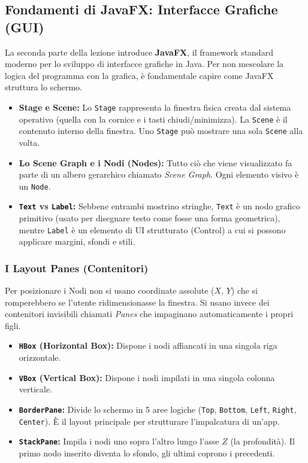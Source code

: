 \documentclass[12pt, a4paper]{article}
\begin{document}
\newpage

\subsection{Fondamenti di JavaFX: Interfacce Grafiche (GUI)}


La seconda parte della lezione introduce \textbf{JavaFX}, il framework standard moderno per lo sviluppo di interfacce grafiche in Java. Per non mescolare la logica del programma con la grafica, è fondamentale capire come JavaFX struttura lo schermo.

\begin{itemize}
    \item \textbf{Stage e Scene:} Lo \texttt{Stage} rappresenta la finestra fisica creata dal sistema operativo (quella con la cornice e i tasti chiudi/minimizza). La \texttt{Scene} è il contenuto interno della finestra. Uno \texttt{Stage} può mostrare una sola \texttt{Scene} alla volta.
    \item \textbf{Lo Scene Graph e i Nodi (Nodes):} Tutto ciò che viene visualizzato fa parte di un albero gerarchico chiamato \textit{Scene Graph}. Ogni elemento visivo è un \texttt{Node}.
    \item \textbf{\texttt{Text} vs \texttt{Label}:} Sebbene entrambi mostrino stringhe, \texttt{Text} è un nodo grafico primitivo (usato per disegnare testo come fosse una forma geometrica), mentre \texttt{Label} è un elemento di UI strutturato (Control) a cui si possono applicare margini, sfondi e stili.
\end{itemize}

\subsubsection{I Layout Panes (Contenitori)}


Per posizionare i Nodi non si usano coordinate assolute ($X$, $Y$) che si romperebbero se l'utente ridimensionasse la finestra. Si usano invece dei contenitori invisibili chiamati \textit{Panes} che impaginano automaticamente i propri figli.
\begin{itemize}
    \item \textbf{\texttt{HBox} (Horizontal Box):} Dispone i nodi affiancati in una singola riga orizzontale.
    \item \textbf{\texttt{VBox} (Vertical Box):} Dispone i nodi impilati in una singola colonna verticale.
    \item \textbf{\texttt{BorderPane}:} Divide lo schermo in 5 aree logiche (\texttt{Top}, \texttt{Bottom}, \texttt{Left}, \texttt{Right}, \texttt{Center}). È il layout principale per strutturare l'impalcatura di un'app.
    \item \textbf{\texttt{StackPane}:} Impila i nodi uno sopra l'altro lungo l'asse $Z$ (la profondità). Il primo nodo inserito diventa lo sfondo, gli ultimi coprono i precedenti.
\end{itemize}
\end{document}
